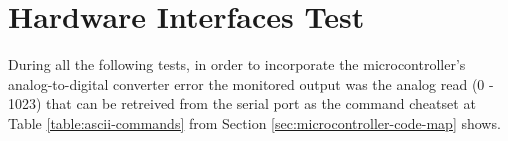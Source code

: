 \section{Hardware Interfaces Test}\label{sec:hardware-interfaces-test}

	During all the following tests, in order to incorporate the microcontroller's analog-to-digital converter error the monitored output was the analog read (0 - 1023) that can be retreived from the serial port as the command cheatset at Table \ref{table:ascii-commands} from Section \ref{sec:microcontroller-code-map} shows.

	
	
	
	